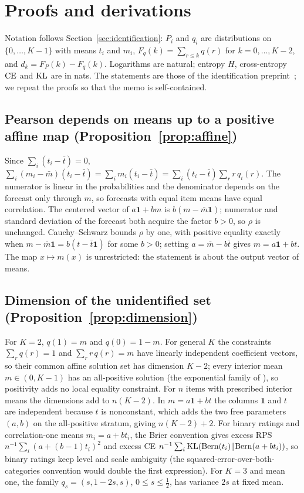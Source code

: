 \section{Proofs and derivations}
\label{app:proofs}

Notation follows Section~\ref{sec:identification}: $P_i$ and $q_i$ are distributions on $\{0,\dots,K-1\}$ with means $t_i$ and $m_i$, $F_q(k)=\sum_{r\le k}q(r)$ for $k=0,\dots,K-2$, and $d_k=F_P(k)-F_q(k)$.
Logarithms are natural; entropy $H$, cross-entropy $\mathrm{CE}$ and $\mathrm{KL}$ are in nats.
The statements are those of the identification preprint~\citep{miranda2026correlation}; we repeat the proofs so that the memo is self-contained.

\subsection{Pearson depends on means up to a positive affine map (Proposition~\ref{prop:affine})}
Since $\sum_i(t_i-\bar t)=0$, $\sum_i(m_i-\bar m)(t_i-\bar t)=\sum_i m_i(t_i-\bar t)=\sum_i(t_i-\bar t)\sum_r r\,q_i(r)$.
The numerator is linear in the probabilities and the denominator depends on the forecast only through $m$, so forecasts with equal item means have equal correlation.
The centered vector of $a\mathbf 1+bm$ is $b(m-\bar m\mathbf 1)$; numerator and standard deviation of the forecast both acquire the factor $b>0$, so $\rho$ is unchanged.
Cauchy--Schwarz bounds $\rho$ by one, with positive equality exactly when $m-\bar m\mathbf 1=b(t-\bar t\mathbf 1)$ for some $b>0$; setting $a=\bar m-b\bar t$ gives $m=a\mathbf 1+bt$.
The map $x\mapsto m(x)$ is unrestricted: the statement is about the output vector of means.

\subsection{Dimension of the unidentified set (Proposition~\ref{prop:dimension})}
For $K=2$, $q(1)=m$ and $q(0)=1-m$.
For general $K$ the constraints $\sum_rq(r)=1$ and $\sum_rr\,q(r)=m$ have linearly independent coefficient vectors, so their common affine solution set has dimension $K-2$; every interior mean $m\in(0,K-1)$ has an all-positive solution (the exponential family of ), so positivity adds no local equality constraint.
For $n$ items with prescribed interior means the dimensions add to $n(K-2)$.
In $m=a\mathbf 1+bt$ the columns $\mathbf 1$ and $t$ are independent because $t$ is nonconstant, which adds the two free parameters $(a,b)$ on the all-positive stratum, giving $n(K-2)+2$.
For binary ratings and correlation-one means $m_i=a+bt_i$, the Brier convention gives excess RPS $n^{-1}\sum_i(a+(b-1)t_i)^2$ and excess CE $n^{-1}\sum_i\mathrm{KL}(\mathrm{Bern}(t_i)\|\mathrm{Bern}(a+bt_i))$, so binary ratings keep level and scale ambiguity (the squared-error-over-both-categories convention would double the first expression).
For $K=3$ and mean one, the family $q_s=(s,1-2s,s)$, $0\le s\le\tfrac12$, has variance $2s$ at fixed mean.

